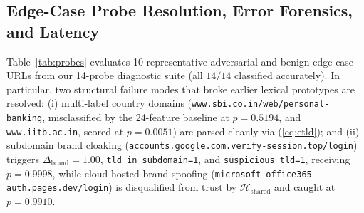 \documentclass[conference]{IEEEtran}
\begin{document}
\begin{table}[t]
\caption{Zero-Shot Cross-Corpus and Live 2026 Zero-Day Generalization}
\label{tab:ood}
\centering
\scriptsize
\renewcommand{\arraystretch}{1.14}
\end{table}

\subsection{Edge-Case Probe Resolution, Error Forensics, and Latency}
\label{sec:errors}
Table~\ref{tab:probes} evaluates 10 representative adversarial and benign edge-case URLs from our 14-probe diagnostic suite (all $14/14$ classified accurately). In particular, two structural failure modes that broke earlier lexical prototypes are resolved: (i) multi-label country domains (\texttt{www.sbi.co.in/\allowbreak web/\allowbreak personal-banking}, misclassified by the 24-feature baseline at $p=0.5194$, and \texttt{www.iitb.ac.in}, scored at $p=0.0051$) are parsed cleanly via (\ref{eq:etld}); and (ii) subdomain brand cloaking (\texttt{accounts.google.com.\allowbreak verify-session.top/\allowbreak login}) triggers $\Delta_{\text{brand}}=1.00$, \texttt{tld\_in\_subdomain=1}, and \texttt{suspicious\_tld=1}, receiving $p=0.9998$, while cloud-hosted brand spoofing (\texttt{microsoft-office365-auth.\allowbreak pages.dev/\allowbreak login}) is disqualified from trust by $\mathcal{H}_{\text{shared}}$ and caught at $p=0.9910$.
\end{document}
